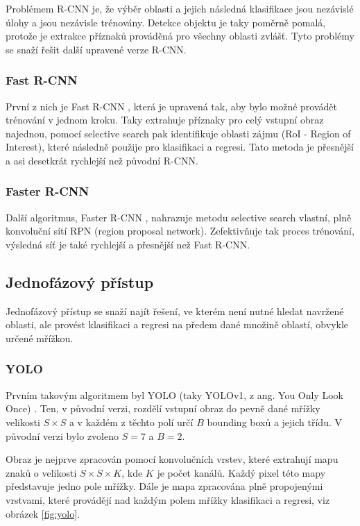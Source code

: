 Problémem R-CNN je, že výběr oblasti a jejich následná klasifikace jsou
nezávislé úlohy a jsou nezávisle trénovány. Detekce objektu je taky poměrně
pomalá, protože je extrakce příznaků prováděná pro všechny oblasti zvlášť. Tyto
problémy se snaží řešit další upravené verze R-CNN.

\subsubsection{Fast R-CNN}
První z nich je Fast R-CNN \cite{fast-r-cnn}, která je upravená tak, aby bylo
možné provádět trénování v jednom kroku. Taky extrahuje příznaky pro celý
vstupní obraz najednou, pomocí selective search pak identifikuje oblasti zájmu
(RoI - Region of Interest), které následně použije pro klasifikaci a regresi.
Tato metoda je přesnější a asi desetkrát rychlejší než původní R-CNN.

\subsubsection{Faster R-CNN}
Další algoritmus, Faster R-CNN \cite{faster-r-cnn}, nahrazuje metodu selective
search vlastní, plně konvoluční sítí RPN (region proposal network).
Zefektivňuje tak proces trénování, výsledná síť je také rychlejší a přesnější
než Fast R-CNN.

\subsection{Jednofázový přístup}

Jednofázový přístup se snaží najít řešení, ve kterém není nutné hledat navržené
oblasti, ale provést klasifikaci a regresi na předem dané množině oblastí,
obvykle určené mřížkou.

\subsubsection{YOLO}
Prvním takovým algoritmem byl YOLO (taky YOLOv1, z ang. You Only Look Once)
\cite{yolo}. Ten, v původní verzi, rozdělí vstupní obraz do pevně dané mřížky
velikosti $S \times S$ a v každém z těchto polí určí $B$ bounding boxů a jejich
třídu. V původní verzi bylo zvoleno $S = 7$ a $B = 2$.

Obraz je nejprve zpracován pomocí konvolučních vrstev, které extrahují mapu
znaků o velikosti $S \times S \times K$, kde $K$ je počet kanálů. Každý pixel
této mapy představuje jedno pole mřížky. Dále je mapa zpracována plně
propojenými vrstvami, které provádějí nad každým polem mřížky klasifikaci a
regresi, viz obrázek \ref{fig:yolo}.


